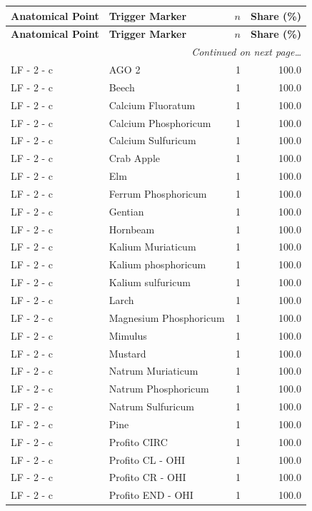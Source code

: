 \documentclass[a4paper,11pt]{article}
\begin{document}
\begin{footnotesize}
\begin{longtable}{p{3.5cm}p{7.5cm}rr}
\toprule
\textbf{Anatomical Point} &
\textbf{Trigger Marker} &
\textbf{$n$} &
\textbf{Share (\%)} \\
\midrule
\endfirsthead
\toprule
\textbf{Anatomical Point} &
\textbf{Trigger Marker} &
\textbf{$n$} &
\textbf{Share (\%)} \\
\midrule
\endhead
\midrule
\multicolumn{4}{r}{\footnotesize\emph{Continued on next page\ldots}} \\
\endfoot
\bottomrule
\endlastfoot
LF - 2 - c & AGO 2 & 1 & 100.0 \\
LF - 2 - c & Beech & 1 & 100.0 \\
LF - 2 - c & Calcium Fluoratum & 1 & 100.0 \\
LF - 2 - c & Calcium Phosphoricum & 1 & 100.0 \\
LF - 2 - c & Calcium Sulfuricum & 1 & 100.0 \\
LF - 2 - c & Crab Apple & 1 & 100.0 \\
LF - 2 - c & Elm & 1 & 100.0 \\
LF - 2 - c & Ferrum Phosphoricum & 1 & 100.0 \\
LF - 2 - c & Gentian & 1 & 100.0 \\
LF - 2 - c & Hornbeam & 1 & 100.0 \\
LF - 2 - c & Kalium Muriaticum & 1 & 100.0 \\
LF - 2 - c & Kalium phosphoricum & 1 & 100.0 \\
LF - 2 - c & Kalium sulfuricum & 1 & 100.0 \\
LF - 2 - c & Larch & 1 & 100.0 \\
LF - 2 - c & Magnesium Phosphoricum & 1 & 100.0 \\
LF - 2 - c & Mimulus & 1 & 100.0 \\
LF - 2 - c & Mustard & 1 & 100.0 \\
LF - 2 - c & Natrum Muriaticum & 1 & 100.0 \\
LF - 2 - c & Natrum Phosphoricum & 1 & 100.0 \\
LF - 2 - c & Natrum Sulfuricum & 1 & 100.0 \\
LF - 2 - c & Pine & 1 & 100.0 \\
LF - 2 - c & Profito CIRC & 1 & 100.0 \\
LF - 2 - c & Profito CL - OHI & 1 & 100.0 \\
LF - 2 - c & Profito CR - OHI & 1 & 100.0 \\
LF - 2 - c & Profito END - OHI & 1 & 100.0 \\

\end{longtable}
\end{footnotesize}
\end{document}
